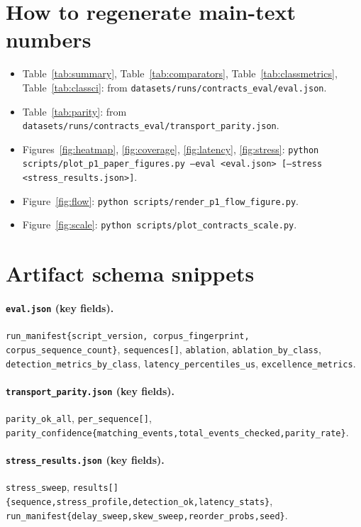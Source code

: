 \documentclass[11pt]{article}
\begin{document}
\section{How to regenerate main-text numbers}
\begin{itemize}[leftmargin=1.5em]
\item Table~\ref{tab:summary}, Table~\ref{tab:comparators}, Table~\ref{tab:classmetrics}, Table~\ref{tab:classci}: from \texttt{datasets/runs/contracts\_eval/eval.json}.
\item Table~\ref{tab:parity}: from \texttt{datasets/runs/contracts\_eval/transport\_parity.json}.
\item Figures~\ref{fig:heatmap}, \ref{fig:coverage}, \ref{fig:latency}, \ref{fig:stress}: \texttt{python scripts/plot\_p1\_paper\_figures.py --eval <eval.json> [--stress <stress\_results.json>]}.
\item Figure~\ref{fig:flow}: \texttt{python scripts/render\_p1\_flow\_figure.py}.
\item Figure~\ref{fig:scale}: \texttt{python scripts/plot\_contracts\_scale.py}.
\end{itemize}

\section{Artifact schema snippets}
\paragraph{\texttt{eval.json} (key fields).}
\texttt{run\_manifest\{script\_version, corpus\_fingerprint, corpus\_sequence\_count\}}, \texttt{sequences[]}, \texttt{ablation}, \texttt{ablation\_by\_class}, \texttt{detection\_metrics\_by\_class}, \texttt{latency\_percentiles\_us}, \texttt{excellence\_metrics}.

\paragraph{\texttt{transport\_parity.json} (key fields).}
\texttt{parity\_ok\_all}, \texttt{per\_sequence[]}, \texttt{parity\_confidence\{matching\_events,total\_events\_checked,parity\_rate\}}.

\paragraph{\texttt{stress\_results.json} (key fields).}
\texttt{stress\_sweep}, \texttt{results[]\{sequence,stress\_profile,detection\_ok,latency\_stats\}}, \texttt{run\_manifest\{delay\_sweep,skew\_sweep,reorder\_probs,seed\}}.
\end{document}
